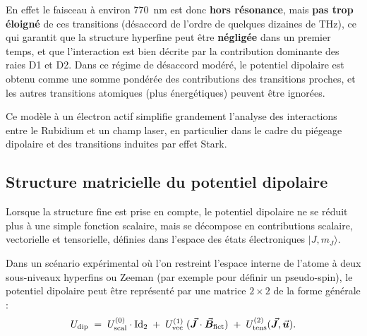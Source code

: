 \medskip

En effet le faisceau à environ 770~nm est donc \textbf{hors résonance}, mais \textbf{pas trop éloigné} de ces transitions (désaccord de l’ordre de quelques dizaines de THz), ce qui garantit que la structure hyperfine peut être \textbf{négligée} dans un premier temps, et que l’interaction est bien décrite par la contribution dominante des raies D1 et D2. Dans ce régime de désaccord modéré, le potentiel dipolaire est obtenu comme une somme pondérée des contributions des transitions proches, et les autres transitions atomiques (plus énergétiques) peuvent être ignorées.

\medskip

Ce modèle à un électron actif simplifie grandement l’analyse des interactions entre le Rubidium et un champ laser, en particulier dans le cadre du piégeage dipolaire et des transitions induites par effet Stark.


\subsection{Structure matricielle du potentiel dipolaire}


Lorsque la structure fine est prise en compte, le potentiel dipolaire ne se réduit plus à une simple fonction scalaire, mais se décompose en contributions scalaire, vectorielle et tensorielle, définies dans l’espace des états électroniques $|J,m_J\rangle$. 

\medskip

Dans un scénario expérimental où l’on restreint l’espace interne de l’atome à deux sous-niveaux hyperfins ou Zeeman (par exemple pour définir un pseudo-spin), le potentiel dipolaire peut être représenté par une matrice $2\times 2$ de la forme générale :
\begin{eqnarray}
	U_{\mathrm{dip}} \;=\; U_{\mathrm{scal}}^{(0)} \cdot \mbox{Id}_2 
	\;+\; U^{(1)}_{\mathrm{vec}}\;(\vec{{\bm{J}}}\cdot\vec{{\bm{B}}}_{\rm fict})
	\;+\; U^{(2)}_{\mathrm{tens}}(\vec{{\bm{J}}},\vec{{\bm{u}}}).
	\label{eq:dipole-potential-decomposition}
\end{eqnarray}

